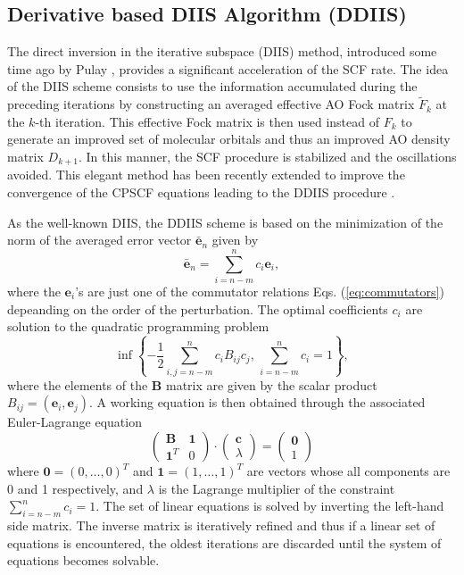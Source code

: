 \documentclass[prl,aps,twocolumn,showpacs,twocolumngrid,superbib]{revtex4}
\begin{document}
\subsection{Derivative based DIIS Algorithm (DDIIS)}
 The direct inversion in the iterative subspace (DIIS) method, introduced
 some time ago by Pulay \cite{Pulay1,Pulay2}, provides a significant 
 acceleration of the SCF rate. The idea of the DIIS scheme consists to use
 the information accumulated during the preceding iterations by 
 constructing an averaged effective AO
 Fock matrix $\widetilde F_{k}$ at the
 $k$-th iteration. This effective Fock matrix is then used instead of $F_{k}$
 to generate an improved set of molecular orbitals and thus an 
 improved AO density matrix $D_{k+1}$. In this manner, the SCF procedure
 is stabilized and the oscillations avoided.
 This elegant method has been recently extended to improve the
 convergence of the CPSCF equations leading to the DDIIS procedure \cite{Weber_2003}.

As the well-known DIIS, the DDIIS scheme is based on the minimization of the norm 
of the averaged error vector $\mathbf{\bar{e}}_n$ given by
\begin{equation}
  \mathbf{\bar{e}}_n=\sum_{i=n-m}^{n}c_i\mathbf{e}_i,
\end{equation}
where the $\mathbf{e}_i$'s are just one of the commutator relations 
Eqs. (\ref{eq:commutators}) depeanding on the order of the perturbation. 
The optimal coefficients $c_i$ are solution to the 
quadratic programming problem
\begin{equation}
  \inf \left \{-\frac{1}{2}\sum_{i,j=n-m}^nc_iB_{ij}c_j,\, \sum_{i=n-m}^n c_i=1 \right \},
\end{equation}
where the elements of the $\mathbf{B}$ matrix are given by 
the scalar product $B_{ij}=(\mathbf{e}_i,\mathbf{e}_j)$.
A working equation is then obtained through the associated Euler-Lagrange equation
\begin{equation}\label{eq:diismatrix}
 \left ( \begin{array}{cc}
     \mathbf{B}     & \mathbf{1} \\
     \mathbf{1}^{T} & 0 
   \end{array}\right )
 \cdot \left ( \begin{array}{c}
     \mathbf{c}     \\
     \lambda  
   \end{array}\right )
  =  \left ( \begin{array}{c}
     \mathbf{0}      \\
         1  
   \end{array}\right )
\end{equation}
 where $\mathbf{0}=(0,\ldots,0)^{T}$ and $\mathbf{1}=(1,\ldots,1)^{T}$ are
 vectors whose all components are 0 and 1 respectively, 
 and $\lambda$ is the Lagrange multiplier of the constraint 
 $\sum_{i=n-m}^{n}c_{i}=1$. The set of linear equations is solved
 by inverting the left-hand side matrix. The inverse matrix is iteratively 
 refined and thus if a linear set of equations is encountered, the oldest
 iterations are discarded until the system of equations becomes solvable.
\end{document}
